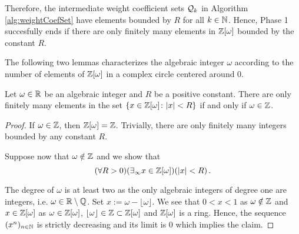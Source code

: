 Therefore, the intermediate weight coefficient sets $\mathcal{Q}_k$ in Algorithm \ref{alg:weightCoefSet} have elements bounded by $R$ for all $k\in\mathbb{N}$. Hence, Phase 1 succesfully ends if there are only finitely many elements in $\mathbb{Z}[\omega]$ bounded by the constant $R$. 


The following two lemmas characterizes the algebraic integer $\omega$ according to the number of elements of $\mathbb{Z}[\omega]$ in a complex circle centered around 0. 
\begin{lem}
\label{lem:numElemRR}
Let $\omega\in\mathbb{R}$ be an algebraic integer and $R$ be a positive constant. There are only finitely many elements in the set $\left\{x \in\mathbb{Z}[\omega] \colon |x|<R \right\}$ if and only if $\omega \in \mathbb{Z}$. 
\end{lem}
\begin{proof}
If $\omega \in \mathbb{Z}$, then $\mathbb{Z}[\omega] = \mathbb{Z}$. Trivially, there are only finitely many integers bounded by any constant $R$.

Suppose now that $\omega \notin \mathbb{Z}$ and we show that 
$$
(\forall R>0) (\exists_\infty x\in \mathbb{Z}[\omega])(|x|<R)\,.
$$ 

The degree of $\omega$ is at least two as the only algebraic integers of degree one are integers, i.e. $\omega \in \mathbb{R} \setminus \mathbb{Q}$. 
Set $x:= \omega- \lfloor \omega \rfloor$. We see that $0<x<1$ as $\omega \notin \mathbb{Z}$ and $x \in \mathbb{Z}[\omega]$ as $\omega \in \mathbb{Z}[\omega]$, $\lfloor \omega \rfloor \in  \mathbb{Z}\subset\mathbb{Z}[\omega]$ and $\mathbb{Z}[\omega]$ is a ring. 
Hence, the sequence $(x^n)_{n\in \mathbb{N}}$ is strictly decreasing and its limit is 0 which implies the claim.
\end{proof}


